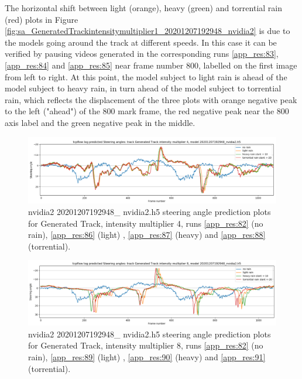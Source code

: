 The horizontal shift between light (orange), heavy (green) and torrential rain (red) plots in Figure \ref{fig:sa_GeneratedTrackintensitymultiplier1_20201207192948_nvidia2} is due to the models going around the track at different speeds. In this case it can be verified by pausing videos generated in the corresponding runs \ref{app_res:83}, \ref{app_res:84} and \ref{app_res:85} near frame number 800, labelled on the first image from left to right. At this point, the model subject to light rain is ahead of the model subject to heavy rain, in turn ahead of the model subject to torrential rain, which reflects the displacement of the three plots with orange negative peak to the left ("ahead") of the 800 mark frame, the red negative peak near the 800 axis label and the green negative peak in the middle.

\begin{figure}[h!]
 \centering 
 \includegraphics[width=\textwidth]{Figures/sa_GeneratedTrackintensitymultiplier4_20201207192948_nvidia2.h5}
 \caption{nvidia2 20201207192948\_ nvidia2.h5  steering angle prediction plots for Generated Track, intensity multiplier 4, runs \ref{app_res:82} (no rain), \ref{app_res:86} (light) , \ref{app_res:87} (heavy) and  \ref{app_res:88} (torrential).}
 \label{fig:sa_GeneratedTrackintensitymultiplier4_20201207192948_nvidia2} 
\end{figure}


\begin{figure}[h!]
 \centering 
 \includegraphics[width=\textwidth]{Figures/sa_GeneratedTrackintensitymultiplier8_20201207192948_nvidia2.h5}
 \caption{nvidia2 20201207192948\_ nvidia2.h5 steering angle prediction plots for Generated Track, intensity multiplier 8, runs \ref{app_res:82} (no rain), \ref{app_res:89} (light) , \ref{app_res:90} (heavy) and  \ref{app_res:91} (torrential).}
 \label{fig:sa_GeneratedTrackintensitymultiplier8_20201207192948_nvidia2} 
\end{figure}

